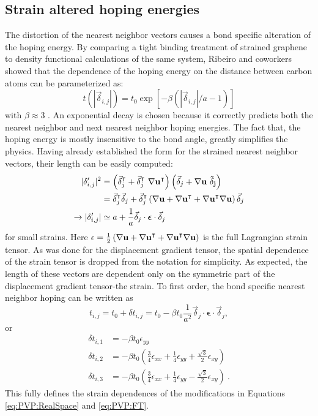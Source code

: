 \subsection{Strain altered hoping energies}
The distortion of the nearest neighbor vectors causes a bond specific alteration of the hoping energy.
By comparing a tight binding treatment of strained graphene to density functional calculations of the same system, Ribeiro and coworkers showed that the dependence of the hoping energy on the distance between carbon atoms can be parameterized as:
\begin{equation*}
  t(|\vec{\delta}_{i,j}|)=t_0 \exp[-\beta (|\vec{\delta}_{i,j}|/a-1)]
\end{equation*}
with $\beta\approx 3$ \cite{Pereira2009,Ribeiro2009,CastroNeto2009}.
An exponential decay is chosen because it correctly predicts both the nearest neighbor and next nearest neighbor hoping energies.
The fact that, the hoping energy is mostly insensitive to the bond angle, greatly simplifies the physics.
Having already established the form for the strained nearest neighbor vectors, their length can be easily computed:
\begin{align*}
  |\delta'_{i,j}|^2&=\left(\vec{\delta}_{j}^{\intercal}+\vec{\delta}_{j}^{\intercal} \ \bf{\nabla u}^{\intercal} \right) 
    \left(\vec{\delta}_{j}+\bf{\nabla u} \ \vec{\delta}_{j} \right) \\
    &=\vec{\delta}_{j}^{\intercal} \vec{\delta}_{j}+
      \vec{\delta}_{j}^{\intercal} \left(\bf{\nabla u}+\bf{\nabla u}^{\intercal}
      +\bf{\nabla u}^{\intercal}\bf{\nabla u} \right) \vec{\delta}_{j} \\
  \rightarrow |\delta'_{i,j}|&\simeq a+\frac{1}{a} \vec{\delta}_{j} \cdot \bm{\epsilon} \cdot \vec{\delta}_{j}
\end{align*}
for small strains.
Here $\epsilon=\frac{1}{2} \left(\bf{\nabla u}+\bf{\nabla u}^{\intercal}+\bf{\nabla u}^{\intercal}\bf{\nabla u} \right)$ is the full Lagrangian strain tensor.
As was done for the displacement gradient tensor, the spatial dependence of the strain tensor is dropped from the notation for simplicity.
As expected, the length of these vectors are dependent only on the symmetric part of the displacement gradient tensor-the strain.
To first order, the bond specific nearest neighbor hoping can be written as
\begin{equation*}
  t_{i,j}=t_0+\delta t_{i,j}=t_0-\beta t_0 \frac{1}{a^2} \vec{\delta}_{j} \cdot \bm{\epsilon} \cdot \vec{\delta}_{j},
\end{equation*}
or
\begin{align}
  \delta t_{i,1}&=-\beta t_0 \epsilon_{yy} \nonumber \\
  \delta t_{i,2}&=-\beta t_0 \left( \frac{3}{4}\epsilon_{xx} +\frac{1}{4} \epsilon_{yy} + \frac{\sqrt{3}}{2} \epsilon_{xy} \right) \nonumber \\
  \delta t_{i,3}&=-\beta t_0 \left( \frac{3}{4}\epsilon_{xx} +\frac{1}{4} \epsilon_{yy} - \frac{\sqrt{3}}{2} \epsilon_{xy} \right)  \label{eq:PVP:dtij}\ .
\end{align}
This fully defines the strain dependences of the modifications in Equations \ref{eq:PVP:RealSpace} and \ref{eq:PVP:FT}.


